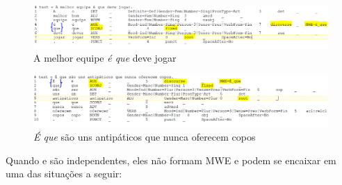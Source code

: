 \documentclass[output=paper,colorlinks,citecolor=brown]{langscibook}
\begin{document}
	\begin{figure}[H]
    	\centering
    	\includegraphics[width=\textwidth,height=\textheight,keepaspectratio]{imagesDrive/image16.png}
    	\caption{A melhor equipe \emph{é que} deve jogar}
    	\label{fig:equeMWE2}
    	\end{figure}{}

	\begin{figure}[H]
    	\centering
    	\includegraphics[width=\textwidth,height=\textheight,keepaspectratio]{imagesDrive/image71.PNG}
    	\caption{\emph{É que} são uns antipáticos que nunca oferecem copos}
    	\label{fig:equeMWE3}
    	\end{figure}{}

	Quando  e  são independentes, eles não formam MWE e podem se encaixar em uma das situações a seguir:
\end{document}
